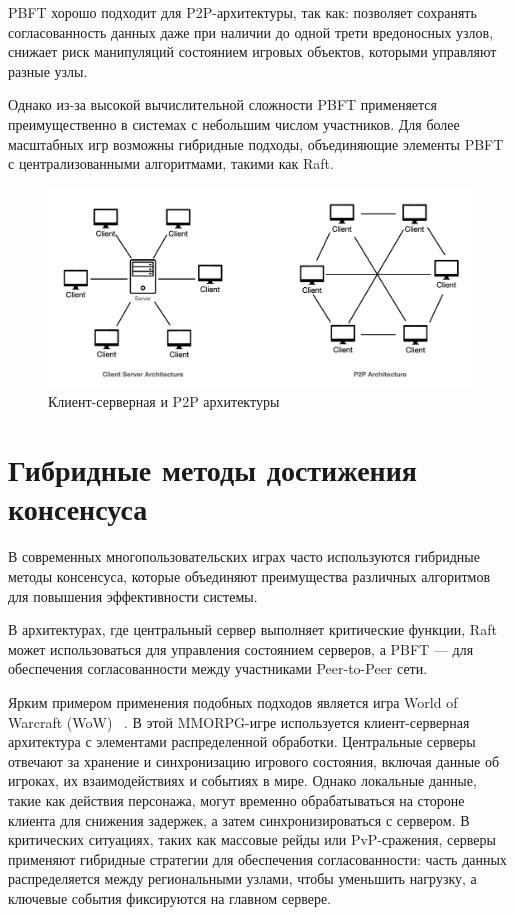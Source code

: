 PBFT хорошо подходит для P2P-архитектуры, так как: позволяет сохранять согласованность данных даже при наличии до одной трети вредоносных узлов, снижает риск манипуляций состоянием игровых объектов, которыми управляют разные узлы.

Однако из-за высокой вычислительной сложности PBFT применяется преимущественно в системах с небольшим числом участников. Для более масштабных игр возможны гибридные подходы, объединяющие элементы PBFT с централизованными алгоритмами, такими как Raft.

\begin{figure}[H]
	\centering
	\includegraphics[width=1\textwidth]{img/1.png}
	\caption{Клиент-серверная и P2P архитектуры}
	\label{img:2-1}
\end{figure}

\chapter{Гибридные методы достижения консенсуса}
В современных многопользовательских играх часто используются гибридные методы консенсуса, которые объединяют преимущества различных алгоритмов для повышения эффективности системы. 

В архитектурах, где центральный сервер выполняет критические функции, Raft может использоваться для управления состоянием серверов, а PBFT — для обеспечения согласованности между участниками Peer-to-Peer сети.

Ярким примером применения подобных подходов является игра World of Warcraft (WoW) ~\cite{b8}. В этой MMORPG-игре используется клиент-серверная архитектура с элементами распределенной обработки. Центральные серверы отвечают за хранение и синхронизацию игрового состояния, включая данные об игроках, их взаимодействиях и событиях в мире. Однако локальные данные, такие как действия персонажа, могут временно обрабатываться на стороне клиента для снижения задержек, а затем синхронизироваться с сервером. В критических ситуациях, таких как массовые рейды или PvP-сражения, серверы применяют гибридные стратегии для обеспечения согласованности: часть данных распределяется между региональными узлами, чтобы уменьшить нагрузку, а ключевые события фиксируются на главном сервере.

